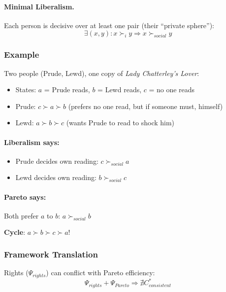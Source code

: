 \paragraph{Minimal Liberalism.}
Each person is decisive over at least one pair (their ``private sphere''):
\begin{equation}
\exists (x, y): x \succ_i y \Rightarrow x \succ_{social} y
\end{equation}

\subsubsection{Example}

Two people (Prude, Lewd), one copy of \textit{Lady Chatterley's Lover}:
\begin{itemize}
    \item States: $a$ = Prude reads, $b$ = Lewd reads, $c$ = no one reads
    \item Prude: $c \succ a \succ b$ (prefers no one read, but if someone must, himself)
    \item Lewd: $a \succ b \succ c$ (wants Prude to read to shock him)
\end{itemize}

\paragraph{Liberalism says:}
\begin{itemize}
    \item Prude decides own reading: $c \succ_{social} a$
    \item Lewd decides own reading: $b \succ_{social} c$
\end{itemize}

\paragraph{Pareto says:}
Both prefer $a$ to $b$: $a \succ_{social} b$

\textbf{Cycle}: $a \succ b \succ c \succ a$!

\subsubsection{Framework Translation}

Rights ($\Psi_{rights}$) can conflict with Pareto efficiency:
\begin{equation}
\Psi_{rights} + \Psi_{Pareto} \Rightarrow \nexists C^*_{consistent}
\end{equation}


